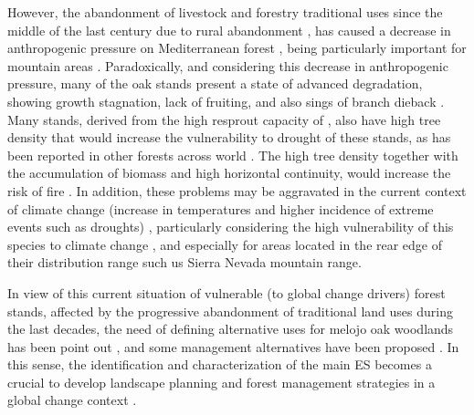 However, the abandonment of livestock and forestry traditional uses since the middle of the last century due to rural abandonment  \autocites{MacDonaldetal2000AgriculturalAbandonment}, has caused a decrease in anthropogenic pressure on Mediterranean forest  \autocites{ValbuenaCarabanaetal2010HistoricalRecent}, being particularly important for mountain areas \autocites{JimenezOlivenciaetal2015MedioSiglo,JimenezOlivenciaetal2015EvolucionUsos,Piasetal2014ColonizationAbandoned}. Paradoxically, and considering this decrease in anthropogenic pressure, many of the oak stands present a state of advanced degradation, showing growth stagnation, lack of fruiting, and also sings of branch dieback \autocites{Canellasetal2004GrowthResponse, Bravoetal2008SelviculturaMontes, ValbuenaCarabanaGil2014EfectosGestion, PiqueVericat2015EvolutionPerspectives, Piqueetal2018Spain}. Many stands, derived from the high resprout capacity of \Qp, also have high tree density that would increase the vulnerability to drought of these stands, as has been reported in other forests across world  \autocite{McDowelletal2020PervasiveShifts}. The high tree density together with the accumulation of biomass and high horizontal continuity, would increase the risk of fire \autocites{Bravoetal2008SelviculturaMontes,GarciaJimenez20099230Robledales}. In addition, these problems may be aggravated in the current context of climate change (increase in temperatures and higher incidence of extreme events such as droughts)  \autocites{IPCC2013ClimateChange,Spinonietal2018WillDrought}, particularly considering the high vulnerability of this species to climate change \autocites{Benitoetal2011SimulatingPotential,GarciaValdesetal2013ChasingMoving,SanchezdeDiosetal2009PresentFuture,GeaIzquierdoetal2013GrowthProjections}, and especially for areas located in the rear edge of their distribution range such us Sierra Nevada mountain range.  

In view of this current situation of vulnerable (to global change drivers) forest stands, affected by the progressive abandonment of traditional land uses during the last decades, the need of defining alternative uses for melojo oak woodlands has been point out \autocites{MesonMontoya1985VegetacionForestal,SanMigueletal2012BosquesMatorrales}, and some management alternatives have been proposed \autocite[\emph{e.g.} sylvopastoral uses, see][]{HerreraCalvo2016UsoPastoral}. In this sense, the identification and characterization of the main ES becomes a crucial to develop landscape planning and forest management strategies in a global change context \autocites{Piqueetal2018Spain}. 


